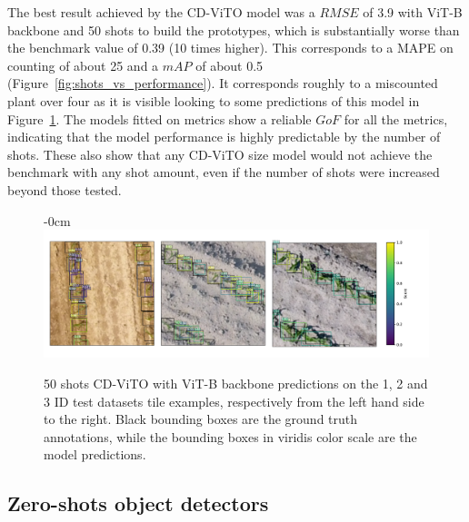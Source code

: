 \documentclass[12pt,a4paper,oneside]{report}
\newlength{\extralength}
\begin{document}
The best result achieved by the CD-ViTO model was a $RMSE$ of 3.9 with ViT-B backbone and 
50 shots to build the prototypes, which is substantially worse than the benchmark value of 0.39 (10 times higher). 
This corresponds to a MAPE on counting of about 25%
and a $mAP$ of about 0.5 (Figure~\ref{fig:shots_vs_performance}).
It corresponds roughly to a miscounted plant over four as it is visible looking to
some predictions of this model in Figure~\ref{fig:annotations_few-shots}.
The models fitted on metrics show a reliable $GoF$ for all
the metrics, indicating that the model performance is highly predictable by the number of shots.
These also show that any CD-ViTO size model would not achieve the
benchmark with any shot amount, even if the number of shots were increased beyond those tested.

\begin{figure}[H]
  \begin{adjustwidth}{-\extralength}{0cm}
  \includegraphics[width=18cm]{Plots/few_shot_annotations.pdf}
  \caption{50 shots CD-ViTO with ViT-B backbone predictions on the 
  1, 2 and 3 ID test datasets tile examples, respectively from the left hand side to the right.
   Black bounding boxes are the ground truth annotations, while the bounding boxes 
   in viridis color scale are the model predictions.}
  \label{fig:annotations_few-shots}
\end{adjustwidth}
\end{figure}

\subsection{Zero-shots object detectors}
\end{document}

